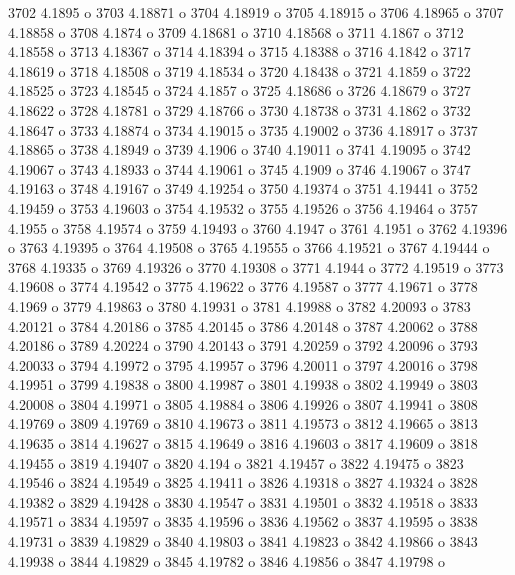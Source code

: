  3702  4.1895  o
 3703  4.18871  o
 3704  4.18919  o
 3705  4.18915  o
 3706  4.18965  o
 3707  4.18858  o
 3708  4.1874  o
 3709  4.18681  o
 3710  4.18568  o
 3711  4.1867  o
 3712  4.18558  o
 3713  4.18367  o
 3714  4.18394  o
 3715  4.18388  o
 3716  4.1842  o
 3717  4.18619  o
 3718  4.18508  o
 3719  4.18534  o
 3720  4.18438  o
 3721  4.1859  o
 3722  4.18525  o
 3723  4.18545  o
 3724  4.1857  o
 3725  4.18686  o
 3726  4.18679  o
 3727  4.18622  o
 3728  4.18781  o
 3729  4.18766  o
 3730  4.18738  o
 3731  4.1862  o
 3732  4.18647  o
 3733  4.18874  o
 3734  4.19015  o
 3735  4.19002  o
 3736  4.18917  o
 3737  4.18865  o
 3738  4.18949  o
 3739  4.1906  o
 3740  4.19011  o
 3741  4.19095  o
 3742  4.19067  o
 3743  4.18933  o
 3744  4.19061  o
 3745  4.1909  o
 3746  4.19067  o
 3747  4.19163  o
 3748  4.19167  o
 3749  4.19254  o
 3750  4.19374  o
 3751  4.19441  o
 3752  4.19459  o
 3753  4.19603  o
 3754  4.19532  o
 3755  4.19526  o
 3756  4.19464  o
 3757  4.1955  o
 3758  4.19574  o
 3759  4.19493  o
 3760  4.1947  o
 3761  4.1951  o
 3762  4.19396  o
 3763  4.19395  o
 3764  4.19508  o
 3765  4.19555  o
 3766  4.19521  o
 3767  4.19444  o
 3768  4.19335  o
 3769  4.19326  o
 3770  4.19308  o
 3771  4.1944  o
 3772  4.19519  o
 3773  4.19608  o
 3774  4.19542  o
 3775  4.19622  o
 3776  4.19587  o
 3777  4.19671  o
 3778  4.1969  o
 3779  4.19863  o
 3780  4.19931  o
 3781  4.19988  o
 3782  4.20093  o
 3783  4.20121  o
 3784  4.20186  o
 3785  4.20145  o
 3786  4.20148  o
 3787  4.20062  o
 3788  4.20186  o
 3789  4.20224  o
 3790  4.20143  o
 3791  4.20259  o
 3792  4.20096  o
 3793  4.20033  o
 3794  4.19972  o
 3795  4.19957  o
 3796  4.20011  o
 3797  4.20016  o
 3798  4.19951  o
 3799  4.19838  o
 3800  4.19987  o
 3801  4.19938  o
 3802  4.19949  o
 3803  4.20008  o
 3804  4.19971  o
 3805  4.19884  o
 3806  4.19926  o
 3807  4.19941  o
 3808  4.19769  o
 3809  4.19769  o
 3810  4.19673  o
 3811  4.19573  o
 3812  4.19665  o
 3813  4.19635  o
 3814  4.19627  o
 3815  4.19649  o
 3816  4.19603  o
 3817  4.19609  o
 3818  4.19455  o
 3819  4.19407  o
 3820  4.194  o
 3821  4.19457  o
 3822  4.19475  o
 3823  4.19546  o
 3824  4.19549  o
 3825  4.19411  o
 3826  4.19318  o
 3827  4.19324  o
 3828  4.19382  o
 3829  4.19428  o
 3830  4.19547  o
 3831  4.19501  o
 3832  4.19518  o
 3833  4.19571  o
 3834  4.19597  o
 3835  4.19596  o
 3836  4.19562  o
 3837  4.19595  o
 3838  4.19731  o
 3839  4.19829  o
 3840  4.19803  o
 3841  4.19823  o
 3842  4.19866  o
 3843  4.19938  o
 3844  4.19829  o
 3845  4.19782  o
 3846  4.19856  o
 3847  4.19798  o
